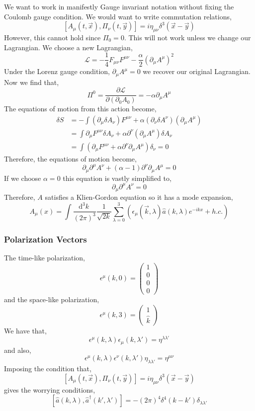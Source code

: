 \documentclass[12pt]{extarticle}
\newcommand{\dn}[2]{\! \mathrm{d}^{#1} #2 \:}
\newcommand{\pderiv}[2]{\frac{\partial{#1}}{\partial{#2}}}
\renewcommand{\a}{\hat{a}}
\newcommand{\adag}{\hat{a}^\dagger}
\newcommand{\lagrange}{\mathcal{L}}
\theoremstyle{definition}
\begin{document}
We want to work in manifestly Gauge invariant notation without fixing the Coulomb gauge condition. We would want to write commutation relations,
\[ [ A_\mu(t, \vec{x}), \Pi_\nu(t, \vec{y}) ] = i \eta_{\mu \nu} \delta^3(\vec{x} - \vec{y}) \]
However, this cannot hold since $\Pi_0  = 0$. This will not work unless we change our Lagrangian. We choose a new Lagrangian,
\[ \lagrange = - \frac{1}{4} F_{\mu \nu} F^{\mu \nu} - \frac{\alpha}{2} (\partial_\mu A^\mu )^2 \]
Under the Lorenz gauge condition, $\partial_\mu A^\mu = 0$ we recover our original Lagrangian. 
Now we find that,
\[ \Pi^0 = \pderiv{\lagrange}{(\partial_0 A_0)} = - \alpha \partial_\mu A^\mu \]
The equations of motion from this action become,
\begin{align*}
\delta S & = - \int (\partial_\mu \delta A_\nu) F^{\mu \nu} + \alpha (\partial_\nu \delta A^\nu ) (\partial_\mu A^\mu) 
\\
& = \int \partial_\mu F^{\mu \nu} \delta A_\nu + \alpha \partial^\nu (\partial_\mu A^\mu) \delta A_\nu
\\
& = \int \left( \partial_\mu F^{\mu \nu} + \alpha \partial^\nu \partial_\mu A^\mu \right) \delta_\nu = 0
\end{align*}
Therefore, the equations of motion become,
\[ \partial_\mu \partial^\mu A^\nu + (\alpha - 1) \partial^\nu \partial_\mu A^\mu = 0 \]
If we choose $\alpha = 0$ this equation is vastly simplified to,
\[ \partial_\mu \partial^\mu A^\nu = 0 \]
Therefore, $A$ satisfies a Klien-Gordon equation so it has a mode expansion,
\[ A_\mu(x) = \int \frac{\dn{3}{k}}{(2 \pi )^3} \frac{1}{\sqrt{2 k}} \sum_{\lambda = 0}^3 \left( \epsilon_\mu(\vec{k}, \lambda) \a(k, \lambda) e^{- i k x} + h.c. \right) \]

\subsubsection{Polarization Vectors}
The time-like polarization,
\[ \epsilon^\mu(k, 0) = 
\begin{pmatrix}
1 \\
0 \\
0 \\
0
\end{pmatrix} \]
and the space-like polarization,
\[ \epsilon^\mu(k, 3) = 
\begin{pmatrix}
1 \\
\hat{k}
\end{pmatrix} \]
We have that,
\[ \epsilon^\mu(k, \lambda) \epsilon_\mu(k, \lambda') = \eta^{\lambda \lambda'} \]
and also,
\[ \epsilon^\mu(k, \lambda) \epsilon^\nu(k, \lambda') \eta_{\lambda \lambda'} = \eta^{\mu \nu }\]
Imposing the condition that,
\[ [ A_\mu(t, \vec{x}), \Pi_\nu(t, \vec{y}) ] = i \eta_{\mu \nu} \delta^3(\vec{x} - \vec{y}) \] 
gives the worrying conditions,
\[ [\a(k, \lambda), \adag(k', \lambda') ] = - (2 \pi )^4 \delta^4(k - k') \delta_{\lambda \lambda'} \]
\end{document}
